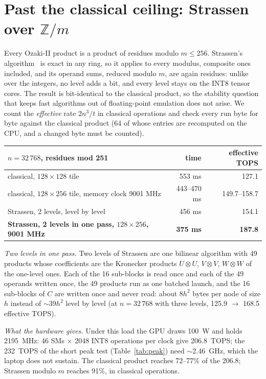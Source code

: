 \documentclass[11pt]{article}
\begin{document}
\section{Past the classical ceiling: Strassen over $\mathbb{Z}/m$}\label{sec:strassen}
Every Ozaki-II product is a product of residues modulo $m\le256$. Strassen's algorithm~\cite{strassen} is exact in any
ring, so it applies to every modulus, composite ones included, and its operand sums, reduced modulo $m$, are again
residues: unlike over the integers, no level adds a bit, and every level stays on the INT8 tensor cores. The result is
bit-identical to the classical product, so the stability question that keeps fast algorithms out of floating-point emulation
does not arise. We count the \emph{effective} rate $2n^3/t$ in classical operations and check every run byte for byte against
the classical product (64 of whose entries are recomputed on the CPU, and a changed byte must be counted).
\begin{center}\begin{tabular}{lrr}\toprule
$n=32\,768$, residues mod 251 & time & effective TOPS \\\midrule
classical, $128\times128$ tile & 553 ms & 127.1 \\
classical, $128\times256$ tile, memory clock 9001 MHz & 443--470 ms & 149.7--158.7 \\
Strassen, 2 levels, level by level & 456 ms & 154.1 \\
\textbf{Strassen, 2 levels in one pass, $128\times256$, 9001 MHz} & \textbf{375 ms} & \textbf{187.8} \\\bottomrule
\end{tabular}\end{center}
\emph{Two levels in one pass.} Two levels of Strassen are one bilinear algorithm with 49 products whose coefficients are the
Kronecker products $U\otimes U$, $V\otimes V$, $W\otimes W$ of the one-level ones. Each of the 16 sub-blocks is read once and
each of the 49 operands written once, the 49 products run as one batched launch, and the 16 sub-blocks of $C$ are written once
and never read: about $8h^2$ bytes per node of size $h$ instead of $\sim$39$h^2$ level by level (at $n=32\,768$ with three
levels, 125.9 $\to$ 168.5 effective TOPS).

\emph{What the hardware gives.} Under this load the GPU draws 100~W and holds 2195~MHz: 46 SMs $\times$ 2048 INT8
operations per clock give 206.8~TOPS; the 232~TOPS of the short peak test (Table~\ref{tab:peak}) need $\sim$2.46~GHz, which
the laptop does not sustain. The classical product reaches 72--77\% of the 206.8; Strassen modulo $m$ reaches 91\%, in classical operations.
\end{document}

